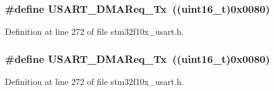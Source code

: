 \subsubsection[{\texorpdfstring{U\+S\+A\+R\+T\+\_\+\+D\+M\+A\+Req\+\_\+\+Tx}{USART_DMAReq_Tx}}]{\setlength{\rightskip}{0pt plus 5cm}\#define U\+S\+A\+R\+T\+\_\+\+D\+M\+A\+Req\+\_\+\+Tx~(({\bf uint16\+\_\+t})0x0080)}\hypertarget{group___u_s_a_r_t___d_m_a___requests_gae38097d8f82ba969c9812194022cae9a}{}\label{group___u_s_a_r_t___d_m_a___requests_gae38097d8f82ba969c9812194022cae9a}


Definition at line 272 of file stm32f10x\+\_\+usart.\+h.

\subsubsection[{\texorpdfstring{U\+S\+A\+R\+T\+\_\+\+D\+M\+A\+Req\+\_\+\+Tx}{USART_DMAReq_Tx}}]{\setlength{\rightskip}{0pt plus 5cm}\#define U\+S\+A\+R\+T\+\_\+\+D\+M\+A\+Req\+\_\+\+Tx~(({\bf uint16\+\_\+t})0x0080)}\hypertarget{group___u_s_a_r_t___d_m_a___requests_gae38097d8f82ba969c9812194022cae9a}{}\label{group___u_s_a_r_t___d_m_a___requests_gae38097d8f82ba969c9812194022cae9a}


Definition at line 272 of file stm32f10x\+\_\+usart.\+h.

